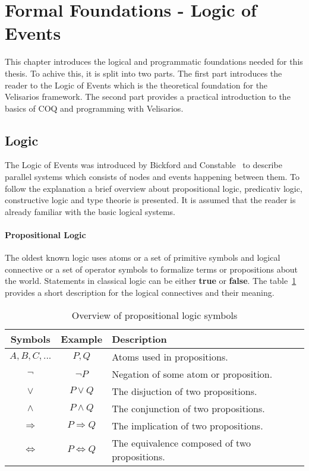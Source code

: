 \section{Formal Foundations - Logic of Events}
\label{sec_logic}

This chapter introduces the logical and programmatic foundations needed for this
thesis. To achive this, it is split into two parts. The first part introduces
the reader to the Logic of Events which is the theoretical foundation for the
Velisarios framework. The second part provides a practical introduction to
the basics of COQ and programming with Velisarios.

\subsection{Logic}

The Logic of Events was introduced by Bickford and
Constable~\cite{bickford2003logic} to describe parallel systems which
consists of nodes and events happening between them. To follow
the explanation a brief overview about propositional logic, predicativ logic,
constructive logic and type theorie is presented. It is assumed that the reader
is already familiar with the basic logical systems.

\paragraph{Propositional Logic}
The oldest known logic uses atoms or a set of primitive symbols and logical
connective or a set of operator symbols to formalize
terms or propositions about the world. Statements in classical logic can be either
\textbf{true} or \textbf{false}. The table~\ref{tab:proplogic} provides
a short description for the logical connectives and their meaning.~\cite{heinemann2013logik}

\begin{table}[h]
  \centering
  \begin{tabular}{c|c|l}
    Symbols & Example & Description\\\hline
    $A,B,C,...$ & $P, Q$ & Atoms used in propositions.\\
    $\neg$ & $\neg P$ & Negation of some atom or proposition.\\
    $\vee$ & $P \vee Q$ & The disjuction of two propositions.\\
    $\wedge$ & $P \wedge Q$ & The conjunction of two propositions.\\
    $\Rightarrow$ & $P \Rightarrow Q$ & The implication of two propositions.\\
    $\Leftrightarrow$ & $P \Leftrightarrow Q$ & The equivalence composed of two propositions.\\
  \end{tabular}
  \caption{Overview of propositional logic symbols}
  \label{tab:proplogic}
\end{table}


